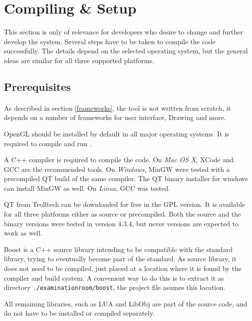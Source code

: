 \section{Compiling \& Setup}
\paragraph{}
This section is only of relevance for developers who desire to change and further develop the system. Several steps have to be taken to compile the code successfully.
The details depend on the selected operating system, but the general ideas are similar for all three supported platforms.

\subsection{Prerequisites}
\paragraph{}
As described in section \ref{frameworks}, the tool is not written from scratch, it depends on a number of frameworks for user interface, Drawing and more.

OpenGL should be installed by default in all major operating systems. It is required to compile and run \ER.

A C++ compiler is required to compile the code.
On \textit{Mac OS X}, XCode and GCC are the recommended tools.
On \textit{Windows}, MinGW were tested with a precompiled QT build of the same compiler.
The QT binary installer for windows can install MinGW as well.
On \textit{Linux}, GCC was tested.

QT from Trolltech can be downloaded for free in the GPL version\cite{qt}.
It is available for all three platforms either as source or precompiled.
Both the source and the binary versions were tested in version 4.3.4, but never versions are expected to work as well.

Boost is a C++ source library intending to be compatible with the standard library, trying to eventually become part of the standard\cite{boost}.
As source library, it does not need to be compiled, just placed at a location where it is found by the compiler and build system.
A convenient way to do this is to extract it as directory \texttt{./examinationroom/boost}, the project file asumes this location.

All remaining libraries, such as LUA and LibObj are part of the source code, and do not have to be installed or compiled separately.



